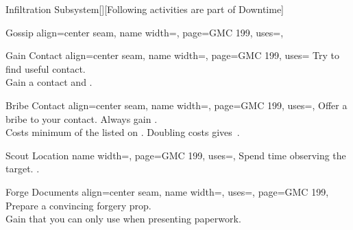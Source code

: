 \begin{PageFrontLandscape}
\begin{TablesHalf}{\frontTableHeight}
\begin{Table}{Infiltration Subsystem}[\;\dash\;][Following activities are part of Downtime]
\begin{entry}{Gossip}{%
                align=center seam,
                name width=\activityLength,%
                page=GMC 199,
                uses={\Diplomacy[tags=S]},
            }
            \end{entry}
            \begin{entry}{Gain Contact}{%
                align=center seam,
                name width=\activityLength,%
                page=GMC 199,
                uses={}
            }
                Try to find useful contact.\\
                Gain a contact and  .\hfill
            \end{entry}
            \begin{entry}{Bribe Contact}{%
                align=center seam,
                name width=\activityLength,%
                page=GMC 199,
                uses=,
            }
                Offer a bribe to your contact. \hfill Always gain  .\\
                Costs minimum  of the  listed on . \hfill
                Doubling costs gives \,\Cirm.\\
            \end{entry}
            \begin{entry}{Scout Location}{%
                name width=\activityLength,%
                page=GMC 199,
                uses=,
            }
                Spend time observing the target.\hfill
                 \hfill
                .
            \end{entry}
            \begin{entry}{Forge Documents}{%
                align=center seam,
                name width=\activityLength,%
                uses={\Society[tags=S]},
                page=GMC 199,
            }
                Prepare a convincing forgery prop. \\
                Gain   that you can only use when presenting paperwork.\hfill

\end{entry}
\end{Table}
\end{TablesHalf}
\end{PageFrontLandscape}
